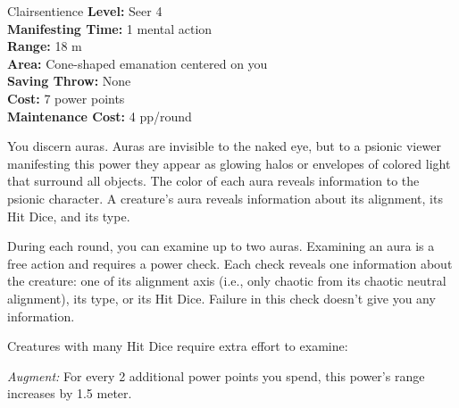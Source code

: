 {Clairsentience}
{
	\textbf{Level:}
	Seer 4\\
	\textbf{Manifesting Time:}
	1 mental action\\
	\textbf{Range:}
	18 m\\
	\textbf{Area:}
	Cone-shaped emanation centered on you\\
	\textbf{Saving Throw:}
	None\\
	\textbf{Cost:}
	7 power points\\
	\textbf{Maintenance Cost:}
	4 pp/round\\
}
{
	You discern auras. Auras are invisible to the naked eye, but to a psionic viewer manifesting this power they appear as glowing halos or envelopes of colored light that surround all objects. The color of each aura reveals information to the psionic character. A creature's aura reveals information about its alignment, its Hit Dice, and its type.

	During each round, you can examine up to two auras. Examining an aura is a free action and requires a power check. Each check reveals one information about the creature: one of its alignment axis (i.e., only chaotic from its chaotic neutral alignment), its type, or its Hit Dice. Failure in this check doesn't give you any information.

	Creatures with many Hit Dice require extra effort to examine:


	\textit{Augment:} For every 2 additional power points you spend, this power's range increases by 1.5 meter.
}